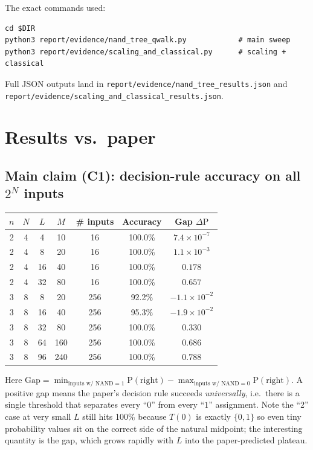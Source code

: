 \documentclass[11pt]{article}
\begin{document}
The exact commands used:
\begin{lstlisting}
cd $DIR
python3 report/evidence/nand_tree_qwalk.py            # main sweep
python3 report/evidence/scaling_and_classical.py      # scaling + classical
\end{lstlisting}
Full JSON outputs land in \verb|report/evidence/nand_tree_results.json| and
\verb|report/evidence/scaling_and_classical_results.json|.

\section{Results vs.\ paper}

\subsection{Main claim (C1): decision-rule accuracy on all $2^N$ inputs}
\begin{center}\small
\begin{tabular}{c c c c c c c}
\toprule
$n$ & $N$ & $L$ & $M$ & \# inputs & Accuracy & Gap $\Delta \mathrm P$\\
\midrule
2 & 4 & 4  & 10  & 16  & 100.0\% & $7.4\times10^{-7}$ \\
2 & 4 & 8  & 20  & 16  & 100.0\% & $1.1\times10^{-3}$ \\
2 & 4 & 16 & 40  & 16  & 100.0\% & $0.178$ \\
2 & 4 & 32 & 80  & 16  & 100.0\% & $\mathbf{0.657}$ \\
3 & 8 & 8  & 20  & 256 & 92.2\%  & $-1.1\times10^{-2}$ \\
3 & 8 & 16 & 40  & 256 & 95.3\%  & $-1.9\times10^{-2}$ \\
3 & 8 & 32 & 80  & 256 & 100.0\% & $0.330$ \\
3 & 8 & 64 & 160 & 256 & 100.0\% & $0.686$ \\
3 & 8 & 96 & 240 & 256 & 100.0\% & $\mathbf{0.788}$ \\
\bottomrule
\end{tabular}
\end{center}
Here $\text{Gap} = \min_{\text{inputs w/ NAND}=1} \mathrm P(\text{right})
- \max_{\text{inputs w/ NAND}=0} \mathrm P(\text{right})$. A positive gap
means the paper's decision rule succeeds \emph{universally}, i.e.\ there is
a single threshold that separates every ``$0$'' from every ``$1$''
assignment. Note the ``2'' case at very small $L$ still hits 100\% because
$T(0)$ is exactly $\{0,1\}$ so even tiny probability values sit on the
correct side of the natural midpoint; the interesting quantity is the
gap, which grows rapidly with $L$ into the paper-predicted plateau.
\end{document}
